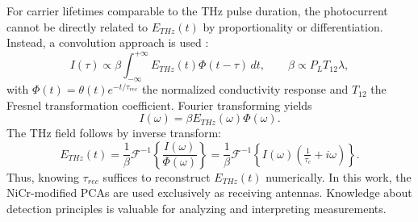 For carrier lifetimes comparable to the THz pulse duration, the photocurrent cannot be directly related to $E_{THz}(t)$ by proportionality or differentiation. Instead, a convolution approach is used \cite{castro-camusPhotoconductiveResponseCorrection2008}:
\begin{equation}
    I(\tau) \propto \beta \int_{-\infty}^{+\infty} E_{THz}(t)\Phi(t-\tau)\, dt ,
    \qquad \beta \propto P_L T_{12} \lambda ,
    \label{eq_conv_integration_detection_2}
\end{equation}
with $\Phi(t) = \theta(t)e^{-t/\tau_{rec}}$ the normalized conductivity response and $T_{12}$ the Fresnel transformation coefficient. Fourier transforming yields
\begin{equation}
    I(\omega) = \beta E_{THz}(\omega)\Phi(\omega).
    \label{eq_FFT_int_det}
\end{equation}
The THz field follows by inverse transform:
\begin{equation}
    E_{THz}(t) = \frac{1}{\beta} \mathcal{F}^{-1}\left\{\frac{I(\omega)}{\Phi(\omega)}\right\}
    = \frac{1}{\beta} \mathcal{F}^{-1}\left\{I(\omega)\left(\tfrac{1}{\tau_c}+i\omega\right)\right\}.
\end{equation}
Thus, knowing $\tau_{rec}$ suffices to reconstruct $E_{THz}(t)$ numerically. In this work, the NiCr-modified PCAs are used exclusively as receiving antennas. Knowledge about detection principles is valuable for analyzing and interpreting measurements. 




